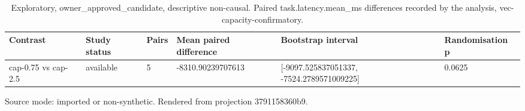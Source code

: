 {
\begin{table}[htbp]
\centering
\caption{Exploratory, owner\_approved\_candidate, descriptive non-causal. Paired task.latency.mean\_ms differences recorded by the analysis, vec-capacity-confirmatory.}
\label{tab:traffictwin-statistical-study-3791158360b9}
\small
\renewcommand{\arraystretch}{1.15}
\begin{tabular}{llllll}
\hline
Contrast & Study status & Pairs & Mean paired difference & Bootstrap interval & Randomisation p \\
\hline
cap-0.75 vs cap-2.5 & available & 5 & -8310.90239707613 & [-9097.525837051337, -7524.2789571009225] & 0.0625 \\
\hline
\end{tabular}
\par\footnotesize
Source mode: imported or non-synthetic.
Rendered from projection 3791158360b9.
\end{table}
}
